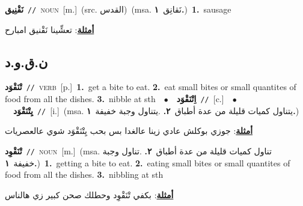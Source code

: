 \documentclass[10pt,a4paper,twoside]{article} %
\begin{document}
\begin{multicols}{2}
{\setlength\topsep{0pt}\textbf{\foreignlanguage{arabic}{نَقْنِيق}}\ {\color{gray}\texttt{//}\color{black}}\ \textsc{noun}\ [m.]\ (src. \color{gray}\foreignlanguage{arabic}{القدس}\color{black})\ \color{gray}(msa. \foreignlanguage{arabic}{نَقانِق}~\foreignlanguage{arabic}{\textbf{١.}})\color{black}\ \textbf{1.}~sausage\  \begin{flushright}\color{gray}\foreignlanguage{arabic}{\textbf{\underline{\foreignlanguage{arabic}{أمثلة}}}: تعشِّينا نَقْنيق امبارح}\end{flushright}\color{black}} \vspace{2mm}

\vspace{-3mm}
\subsection*{\color{blue}\foreignlanguage{arabic}{ن.ق.و.د}\color{blue}{}} 

{\setlength\topsep{0pt}\textbf{\foreignlanguage{arabic}{تْنَقْوَد}}\ {\color{gray}\texttt{//}\color{black}}\ \textsc{verb}\ [p.]\ \textbf{1.}~get a bite to eat.  \textbf{2.}~eat small bites or small quantites of food from all the dishes.  \textbf{3.}~nibble at sth\ \ $\bullet$\ \ \setlength\topsep{0pt}\textbf{\foreignlanguage{arabic}{اِتْنَقْوَد}}\ {\color{gray}\texttt{//}\color{black}}\ [c.]\ \ $\bullet$\ \ \setlength\topsep{0pt}\textbf{\foreignlanguage{arabic}{يِتْنَقْوَد}}\ {\color{gray}\texttt{//}\color{black}}\ [i.]\ \color{gray}(msa. \foreignlanguage{arabic}{يتناول كميات قليلة من عدة أطباق}~\foreignlanguage{arabic}{\textbf{٢.}}  .\foreignlanguage{arabic}{يتناول وجبة خفيفة}~\foreignlanguage{arabic}{\textbf{١.}})\color{black}\  \begin{flushright}\color{gray}\foreignlanguage{arabic}{\textbf{\underline{\foreignlanguage{arabic}{أمثلة}}}: جوزي بوكلش عادي زينا عالغدا بس بحب يِتْنَقْوَد شوي عالعصريات}\end{flushright}\color{black}} \vspace{2mm}

{\setlength\topsep{0pt}\textbf{\foreignlanguage{arabic}{تْنَقْوِد}}\ {\color{gray}\texttt{//}\color{black}}\ \textsc{noun}\ [m.]\ \color{gray}(msa. \foreignlanguage{arabic}{تناول كميات قليلة من عدة أطباق}~\foreignlanguage{arabic}{\textbf{٢.}}  .\foreignlanguage{arabic}{تناول وجبة خفيفة}~\foreignlanguage{arabic}{\textbf{١.}})\color{black}\ \textbf{1.}~getting a bite to eat.  \textbf{2.}~eating small bites or small quantites of food from all the dishes.  \textbf{3.}~nibbling at sth\  \begin{flushright}\color{gray}\foreignlanguage{arabic}{\textbf{\underline{\foreignlanguage{arabic}{أمثلة}}}: بكفي تْنَقْوِد وحطلك صحن كبير زي هالناس}\end{flushright}\color{black}} \vspace{2mm}


\end{multicols}
\end{document}
